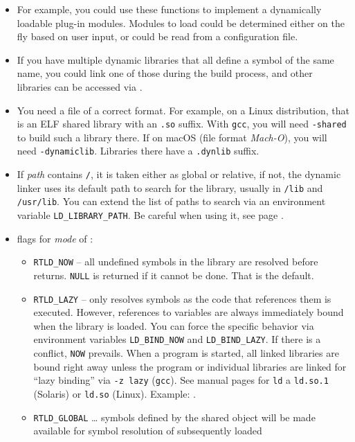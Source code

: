 \begin{itemize}
\item For example, you could use these functions to implement a dynamically
loadable plug-in modules.  Modules to load could be determined either on the fly
based on user input, or could be read from a configuration file.
\item If you have multiple dynamic libraries that all define a symbol of the
same name, you could link one of those during the build process, and other
libraries can be accessed via .
\item You need a file of a correct format.  For example, on a Linux
distribution, that is an ELF shared library with an \texttt{.so} suffix.  With
\texttt{gcc}, you will need \texttt{-shared} to build such a library there.  If
on macOS (file format \emph{Mach-O}), you will need \texttt{-dynamiclib}.
Libraries there have a \texttt{.dynlib} suffix.
\item If \emph{path} contains \texttt{/}, it is taken either as global or
relative, if not, the dynamic linker uses its default path to search for the
library, usually in \texttt{/lib} and \texttt{/usr/lib}.  You can extend the
list of paths to search via an environment variable \texttt{LD\_LIBRARY\_PATH}.
Be careful when using it, see page \pageref{EVIL_LDLIBPATH}.
\item flags for \emph{mode} of :
    \begin{itemize}
    \item \texttt{RTLD\_NOW} -- all undefined symbols in the library are
    resolved before  returns. \texttt{NULL} is returned if it
    cannot be done. That is the default.
    \item \texttt{RTLD\_LAZY} -- only resolves symbols as the code that
    references them is executed.  However, references to variables are always
    immediately bound when the library is loaded.  You can force the specific
    behavior via environment variables \texttt{LD\_BIND\_NOW} and
    \texttt{LD\_BIND\_LAZY}.  If there is a conflict, \texttt{NOW} prevails.
    When a program is started, all linked libraries are bound right away unless
    the program or individual libraries are linked for ``lazy binding'' via
    \texttt{-z lazy} (\texttt{gcc}).  See manual pages for \texttt{ld} a
    \texttt{ld.so.1} (Solaris) or \texttt{ld.so} (Linux).  Example:
    .
    \item \texttt{RTLD\_GLOBAL} \dots{} symbols defined by the shared object
    will be  made available for symbol resolution of subsequently loaded

\end{itemize}
\end{itemize}
